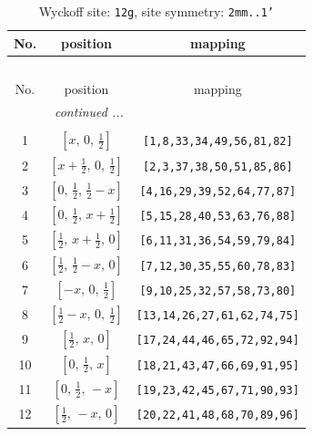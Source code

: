 \documentclass[fleqn,8pt]{jsarticle}
\begin{document}
\begin{longtable}{ccc}
\caption{Wyckoff site: {\tt 12g}, site symmetry: {\tt 2mm..1'}}
 \\
 \hline \hline
No. & position & mapping \\ \hline \endfirsthead

\multicolumn{2}{l}{\tablename\ \thetable{}} \\
 \hline \hline
No. & position & mapping \\ \hline \endhead

 \hline \hline
\multicolumn{2}{r}{\footnotesize\it continued ...} \\ \endfoot

 \hline \hline
\multicolumn{2}{r}{} \\ \endlastfoot

1 & $\left[ x,\, 0,\, \frac{1}{2} \right]$ & {\tt [1,8,33,34,49,56,81,82]} \\ \hline
2 & $\left[ x + \frac{1}{2},\, 0,\, \frac{1}{2} \right]$ & {\tt [2,3,37,38,50,51,85,86]} \\ \hline
3 & $\left[ 0,\, \frac{1}{2},\, \frac{1}{2} - x \right]$ & {\tt [4,16,29,39,52,64,77,87]} \\ \hline
4 & $\left[ 0,\, \frac{1}{2},\, x + \frac{1}{2} \right]$ & {\tt [5,15,28,40,53,63,76,88]} \\ \hline
5 & $\left[ \frac{1}{2},\, x + \frac{1}{2},\, 0 \right]$ & {\tt [6,11,31,36,54,59,79,84]} \\ \hline
6 & $\left[ \frac{1}{2},\, \frac{1}{2} - x,\, 0 \right]$ & {\tt [7,12,30,35,55,60,78,83]} \\ \hline
7 & $\left[ - x,\, 0,\, \frac{1}{2} \right]$ & {\tt [9,10,25,32,57,58,73,80]} \\ \hline
8 & $\left[ \frac{1}{2} - x,\, 0,\, \frac{1}{2} \right]$ & {\tt [13,14,26,27,61,62,74,75]} \\ \hline
9 & $\left[ \frac{1}{2},\, x,\, 0 \right]$ & {\tt [17,24,44,46,65,72,92,94]} \\ \hline
10 & $\left[ 0,\, \frac{1}{2},\, x \right]$ & {\tt [18,21,43,47,66,69,91,95]} \\ \hline
11 & $\left[ 0,\, \frac{1}{2},\, - x \right]$ & {\tt [19,23,42,45,67,71,90,93]} \\ \hline
12 & $\left[ \frac{1}{2},\, - x,\, 0 \right]$ & {\tt [20,22,41,48,68,70,89,96]} \\
\end{longtable}
\renewcommand{\arraystretch}{1.2}
\end{document}
